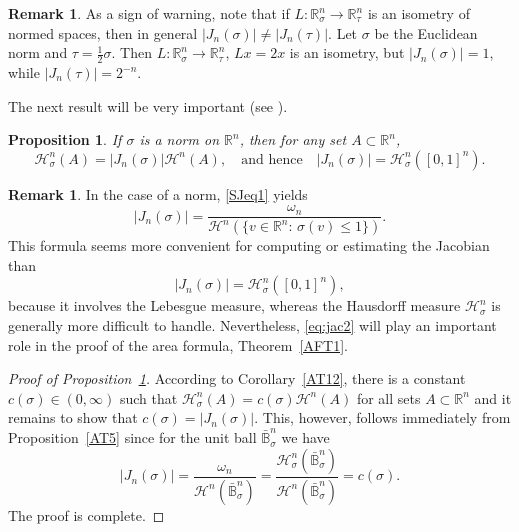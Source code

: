 \documentclass[12pt,leqno]{amsart}
\newtheorem{proposition}[theorem]{Proposition}
\theoremstyle{definition}
\newtheorem{remark}[theorem]{Remark}
\newcommand{\bbbr}{\mathbb R}
\newcommand{\Bbbb}{\bar{\mathbb B}}
\def\H{{\mathcal H}}
\numberwithin{theorem}{section} \numberwithin{equation}{section}
\begin{document}
\begin{remark}
\label{SJR1}
As a sign of warning, note that
if $L:\bbbr^n_\sigma\to \bbbr^n_\tau$ is an isometry of normed spaces, then in general $|J_n(\sigma)|\neq |J_n(\tau)|$. Let $\sigma$ be the Euclidean norm and $\tau=\tfrac{1}{2}\sigma$. Then $L:\bbbr^n_\sigma\to\bbbr^n_\tau$, $Lx=2x$ is an isometry, but $|J_n(\sigma)|=1$, while $|J_n(\tau)|=2^{-n}$.
\end{remark}




The next result will be very important (see \cite[Lemma~6]{kir}).
\begin{proposition}
\label{SJT1}
If $\sigma$ is a norm on $\bbbr^n$, then for any set $A\subset\bbbr^n$,
\begin{equation}
\label{eq:jac2}
\H^n_\sigma(A) = |J_n(\sigma)| \mathcal{H}^n(A),
\quad
\text{and hence}
\quad
|J_n(\sigma)|=\H^n_\sigma([0,1]^n).
\end{equation}
\end{proposition}
\begin{remark}
In the case of a norm, \eqref{SJeq1} yields
\begin{equation}
\label{SJeq3}
|J_n(\sigma)|=\frac{\omega_n}{\H^n(\{v\in\bbbr^n:\, \sigma(v)\le 1\})}.
\end{equation}
This formula seems more convenient for computing or estimating the Jacobian than
\[
|J_n(\sigma)|=\H^n_\sigma([0,1]^n),
\]
because it involves the Lebesgue measure, whereas the Hausdorff measure $\H^n_\sigma$ is generally more difficult to handle. Nevertheless, \eqref{eq:jac2} will play an important role in the proof of the area formula, Theorem~\ref{AFT1}.
\end{remark}


\begin{proof}[Proof of Proposition~\ref{SJT1}]
According to Corollary~\ref{AT12}, there is a constant $c(\sigma)\in (0,\infty)$ such that $\H^n_\sigma(A)=c(\sigma)\H^n(A)$ for all sets $A\subset\bbbr^n$ and it remains to show that $c(\sigma)=|J_n(\sigma)|$. This, however, follows immediately from Proposition~\ref{AT5} since
for the unit ball $\Bbbb^n_\sigma$ we have
$$
|J_n(\sigma)|=\frac{\omega_n}{\H^n(\Bbbb_\sigma^n)}=\frac{\H^n_\sigma(\Bbbb^n_\sigma)}{\H^n(\Bbbb^n_\sigma)}=c(\sigma).
$$
The proof is complete.
\end{proof}
\end{document}
